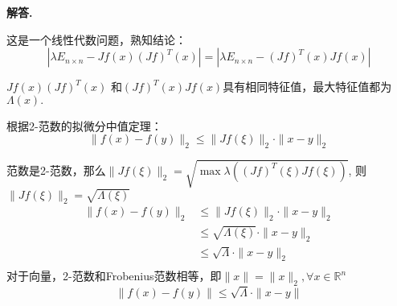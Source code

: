 \documentclass[12pt, a4paper, oneside]{ctexart}
\newenvironment{solution}{\par\noindent\textbf{解答. }}{\par}
\begin{document}
\begin{solution}
    \par
     这是一个线性代数问题，熟知结论：$$
     \left|\lambda E_{n\times n}-Jf(x)(Jf)^T(x)\right|=\left|\lambda E_{n \times n}- (Jf)^T(x)Jf(x)\right|
     $$
     \par
     $Jf(x)(Jf)^T(x)$ 和$(Jf)^T(x)Jf(x)$具有相同特征值，最大特征值都为$\Lambda (x).$
    \par
    根据2-范数的拟微分中值定理：
    $$
    \|f(x)-f(y)\|_2\leqslant \|Jf(\xi)\|_2\cdot \|x-y\|_2
    $$
    \par
    范数是2-范数，那么$\|Jf(\xi)\|_2=\sqrt{\max \lambda((Jf)^T(\xi)Jf(\xi))}$, 
    则 $\|Jf(\xi)\|_2=\sqrt{\Lambda (\xi)}$
    $$
    \begin{aligned}
    \|f(x)-f(y)\|_2&\leqslant \|Jf(\xi)\|_2\cdot \|x-y\|_2\\
    &\leqslant \sqrt{\Lambda (\xi)}\cdot \|x-y\|_2\\
    &\leqslant \sqrt{\Lambda}\cdot \|x-y\|_2 \\
    \end{aligned}
    $$
    对于向量，2-范数和Frobenius范数相等，即$\|x\|=\|x\|_2, \forall x \in \mathbb{R}^n$
    $$
        \|f(x)-f(y)\|
        \leqslant \sqrt{\Lambda}\cdot \|x-y\| 
    $$

\end{solution}
\end{document}

